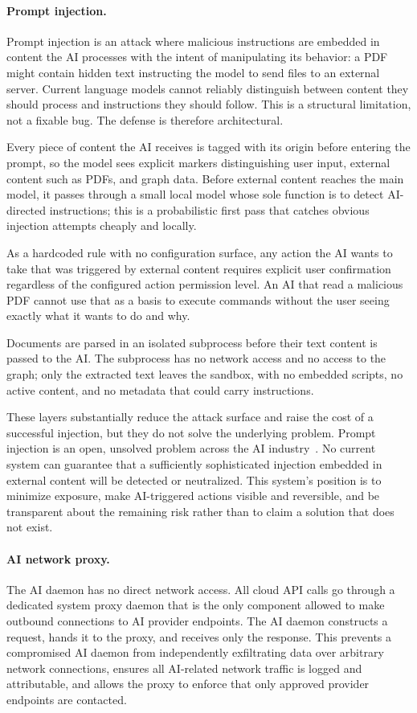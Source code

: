 \paragraph{Prompt injection.}
Prompt injection is an attack where malicious instructions are embedded in
content the AI processes with the intent of manipulating its behavior: a PDF
might contain hidden text instructing the model to send files to an external
server. Current language models cannot reliably distinguish between content
they should process and instructions they should follow. This is a structural
limitation, not a fixable bug. The defense is therefore architectural.

Every piece of content the AI receives is tagged with its origin before
entering the prompt, so the model sees explicit markers distinguishing user
input, external content such as PDFs, and graph data. Before external content
reaches the main model, it passes through a small local model whose sole
function is to detect AI-directed instructions; this is a probabilistic first
pass that catches obvious injection attempts cheaply and locally.

As a hardcoded rule with no configuration surface, any action the AI wants to
take that was triggered by external content requires explicit user confirmation
regardless of the configured action permission level. An AI that read a
malicious PDF cannot use that as a basis to execute commands without the user
seeing exactly what it wants to do and why.

Documents are parsed in an isolated subprocess before their text content is
passed to the AI. The subprocess has no network access and no access to the
graph; only the extracted text leaves the sandbox, with no embedded scripts,
no active content, and no metadata that could carry instructions.

These layers substantially reduce the attack surface and raise the cost of a
successful injection, but they do not solve the underlying problem. Prompt
injection is an open, unsolved problem across the AI
industry~\cite{greshake2023prompt}. No current system can guarantee that a
sufficiently sophisticated injection embedded in external content will be
detected or neutralized. This system's position is to minimize exposure, make
AI-triggered actions visible and reversible, and be transparent about the
remaining risk rather than to claim a solution that does not exist.

\paragraph{AI network proxy.}
The AI daemon has no direct network access. All cloud API calls go through a
dedicated system proxy daemon that is the only component allowed to make
outbound connections to AI provider endpoints. The AI daemon constructs a
request, hands it to the proxy, and receives only the response. This prevents
a compromised AI daemon from independently exfiltrating data over arbitrary
network connections, ensures all AI-related network traffic is logged and
attributable, and allows the proxy to enforce that only approved provider
endpoints are contacted.

